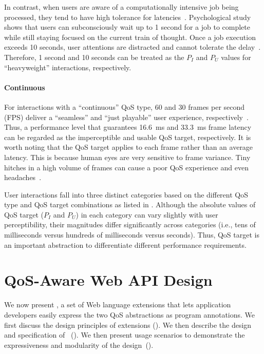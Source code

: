 In contrast, when users are aware of a computationally intensive job being processed, they tend to have high tolerance for latencies~\cite{usability_engineering}. Psychological study shows that users can subconsciously wait up to 1 second for a job to complete while still staying focused on the current train of thought. Once a job execution exceeds 10 seconds, user attentions are distracted and cannot tolerate the delay~\cite{info_vis,response_time}. Therefore, 1 second and 10 seconds can be treated as the $P_I$ and $P_U$ values for ``heavyweight'' interactions, respectively.

\paragraph{Continuous} For interactions with a ``continuous'' QoS type, 60 and 30 frames per second (FPS) deliver a ``seamless'' and ``just playable'' user experience, respectively~\cite{fps_target}. Thus, a performance level that guarantees 16.6~ms and 33.3~ms frame latency can be regarded as the imperceptible and usable QoS target, respectively. It is worth noting that the QoS target applies to each frame rather than an average latency. This is because human eyes are very sensitive to frame variance. Tiny hitches in a high volume of frames can cause a poor QoS experience and even headaches~\cite{jankbusting,adaptivevsync}.

User interactions fall into three distinct categories based on the different QoS type and QoS target combinations as listed in . Although the absolute values of QoS target ($P_I$ and $P_U$) in each category can vary slightly with user perceptibility, their magnitudes differ significantly across categories (i.e., tens of milliseconds versus hundreds of milliseconds versus seconds). Thus, QoS target is an important abstraction to differentiate different performance requirements.

\section{QoS-Aware Web API Design}
\label{sec:lang:spec}

We now present \greenweb, a set of Web language extensions that lets application developers easily express the two QoS abstractions as program annotations. We first discuss the design principles of \greenweb extensions (). We then describe the design and specification of \greenweb~(). We then present usage scenarios to demonstrate the expressiveness and modularity of the \greenweb design~().

